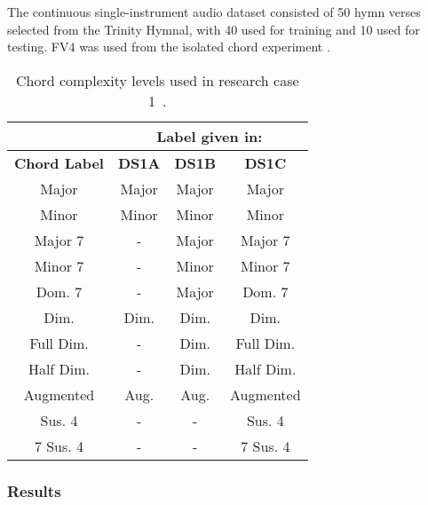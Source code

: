 \documentclass{sig-alternate}
\begin{document}

The continuous single-instrument audio dataset consisted of 50 hymn verses selected from the Trinity Hymnal, with 40 used for training and 10 used for testing. FV4 was used from the isolated chord experiment \cite{Morman:2006}.



\begin{table}
\centering
\begin{tabular}{|c|c|c|c|} \hline
&\multicolumn{3}{|c|}{\textbf{Label given in:}} \\ \hline
\textbf{Chord Label} & \textbf{DS1A} & \textbf{DS1B} & \textbf{DS1C} \\ \hline
Major & Major & Major & Major \\ \hline
Minor & Minor & Minor & Minor \\ \hline
Major 7 & - & Major & Major 7 \\ \hline
Minor 7 & - & Minor & Minor 7 \\ \hline
Dom. 7 & - & Major & Dom. 7 \\ \hline
Dim. & Dim. & Dim. & Dim. \\ \hline
Full Dim. & - & Dim. & Full Dim. \\ \hline
Half Dim. & - & Dim. & Half Dim. \\ \hline
Augmented & Aug. & Aug. & Augmented \\ \hline
Sus. 4 & - & - & Sus. 4 \\ \hline
7 Sus. 4 & - & - & 7 Sus. 4 \\ \hline
\end{tabular}
\caption{Chord complexity levels used in research case 1~\cite{Morman:2006}.}
\label{tab:tab1}
\end{table} 



\subsubsection{Results}
\end{document}
